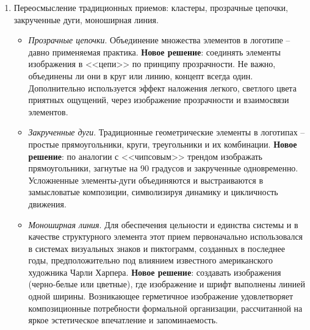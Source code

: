 \begin{enumerate}[label=\asbuk*)]
\item Переосмысление традиционных приемов:  кластеры, прозрачные цепочки, закрученные дуги,
  моноширная линия.
  \begin{itemize}
  \item \emph{Прозрачные цепочки}. Объединение множества элементов в логотипе -- давно применяемая
    практика. \textbf{Новое решение}: соединять элементы изображения в <<цепи>> по принципу
    прозрачности. Не важно, объединены ли они в круг или линию, концепт всегда один. Дополнительно
    используется эффект наложения легкого, светлого цвета приятных ощущений, через изображение
    прозрачности и взаимосвязи элементов.
  \item \emph{Закрученные дуги}. Традиционные  геометрические элементы в логотипах -- простые
    прямоугольники, круги, треугольники и их комбинации. \textbf{Новое решение}: по аналогии с
    <<чипсовым>> трендом изображать  прямоугольники,  загнутые на 90 градусов и закрученные
    одновременно. Усложненные элементы-дуги объединяются и выстраиваются в замысловатые композиции,
    символизируя динамику и цикличность движения.
  \item \emph{Моноширная линия}.  Для обеспечения цельности и единства системы и в качестве структурного
    элемента этот прием первоначально использовался в системах визуальных знаков и пиктограмм,
    созданных в последнее годы, предположительно под влиянием известного американского художника
    Чарли Харпера. \textbf{Новое решение}: создавать изображения  (черно-белые или цветные), где
    изображение и шрифт выполнены линией одной ширины. Возникающее герметичное изображение
    удовлетворяет композиционные потребности  формальной организации, рассчитанной на яркое
    эстетическое впечатление и запоминаемость.
  \end{itemize}


\end{enumerate}
